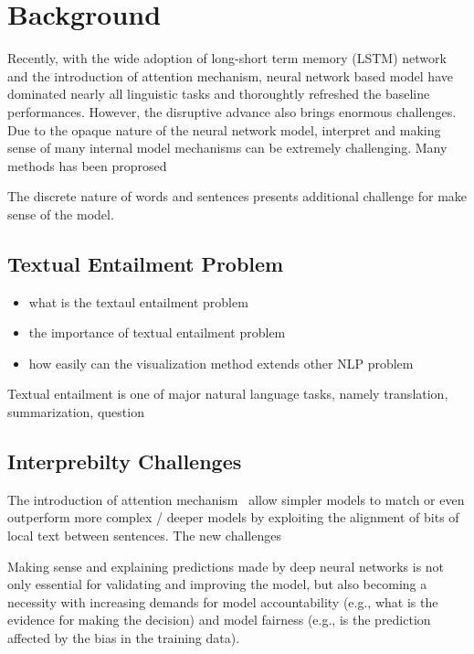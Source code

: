 \section{Background}

Recently, with the wide adoption of long-short term memory
(LSTM) network and the introduction of attention mechanism,
neural network based model have
dominated nearly all linguistic tasks and thoroughtly refreshed the
baseline performances.
%
However, the disruptive advance also brings enormous challenges.
Due to the opaque nature of the neural network model, interpret and making sense
of many internal model mechanisms can be extremely challenging.
%
Many methods has been proprosed

The discrete nature of words and
sentences presents additional challenge for make sense of the model.
%

\subsection{Textual Entailment Problem}

\begin{itemize}
    \item what is the textaul entailment problem
    \item the importance of textual entailment problem
    \item how easily can the visualization method extends other NLP problem
\end{itemize}

Textual entailment is one of major natural language tasks, namely translation,
summarization, question

\subsection{Interprebilty Challenges}

The introduction of attention mechanism~\cite{} allow simpler models to match or even outperform more complex / deeper models by exploiting the alignment of bits of local text between sentences. The new challenges

Making sense and explaining predictions made by deep neural networks is not only essential for validating and improving the model, but also becoming a necessity with increasing demands for model accountability (e.g., what is the evidence for making the decision) and model fairness (e.g., is the prediction affected by the bias in the training data).
